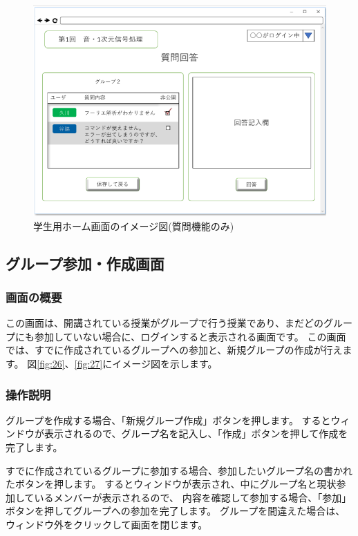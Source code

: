 \begin{figure}[phtbp]
  \begin{center}
    \includegraphics[width=1\linewidth,clip]{./img/25.png}
    \caption{学生用ホーム画面のイメージ図(質問機能のみ)}\label{fig:25}
  \end{center}
\end{figure}

\newpage

\subsection{グループ参加・作成画面}
\subsubsection{画面の概要}
この画面は、開講されている授業がグループで行う授業であり、まだどのグループにも参加していない場合に、ログインすると表示される画面です。
この画面では、すでに作成されているグループへの参加と、新規グループの作成が行えます。
図\ref{fig:26}、\ref{fig:27}にイメージ図を示します。

\subsubsection{操作説明}
グループを作成する場合、「新規グループ作成」ボタンを押します。
するとウィンドウが表示されるので、グループ名を記入し、「作成」ボタンを押して作成を完了します。

すでに作成されているグループに参加する場合、参加したいグループ名の書かれたボタンを押します。
するとウィンドウが表示され、中にグループ名と現状参加しているメンバーが表示されるので、
内容を確認して参加する場合、「参加」ボタンを押してグループへの参加を完了します。
グループを間違えた場合は、ウィンドウ外をクリックして画面を閉じます。

